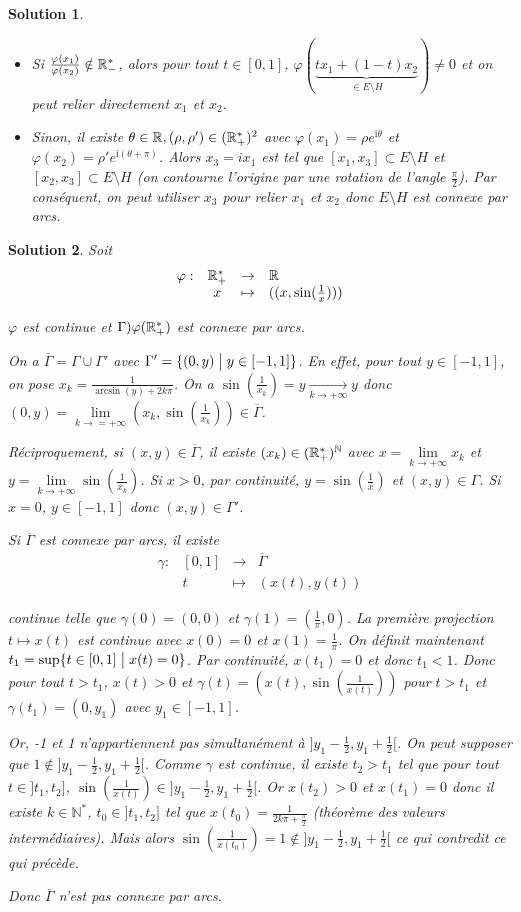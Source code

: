 \documentclass[12pt]{article}
\newtheorem{solution}{Solution}[section]
\theoremstyle{remark}
\newcommand{\N}{\mathbb{N}} \newcommand{\Z}{\mathbb{Z}}
\newcommand{\function}[5]{
	$$
	\begin{array}{rccl}
		#1: & #2 & \to & #3 \\
		& #4 & \mapsto & #5
	\end{array}
	$$
}
\numberwithin{equation}{section}
\begin{document}
\begin{solution}
\begin{enumerate}
		\begin{itemize}
			\item Si $\frac{\varphi(x_{1})}{\varphi(x_{2})}\notin\mathbb{R}_{-}^{*}$, alors pour tout $t\in[0,1]$, $\varphi(\underbrace{tx_{1}+(1-t)x_{2}}_{\in E\setminus H})\neq0$ et on peut relier directement $x_{1}$ et $x_{2}$.
			\item Sinon, il existe $\theta\in\mathbb{R},(\rho,\rho')\in(\mathbb{R}_{+}^{*})^{2}$ avec $\varphi(x_{1})=\rho e^{\mathrm{i}\theta}$ et $\varphi(x_{2})=\rho'e^{\mathrm{i}(\theta+\pi)}$. Alors $x_{3}=ix_{1}$ est tel que $[x_{1},x_{3}]\subset E\setminus H$ et $[x_{2},x_{3}]\subset E\setminus H$ (on contourne l'origine par une rotation de l'angle $\frac{\pi}{2}$). Par conséquent, on peut utiliser $x_{3}$ pour relier $x_{1}$ et $x_{2}$ donc $E\setminus H$ est connexe par arcs.
		\end{itemize}
	\end{enumerate}
\end{solution}

\begin{solution}
	Soit \function{\varphi}{\R_{+}^{*}}{\R}{x}{((x,\sin(\frac{1}{x})))}
	$\varphi$ est continue et $\Gamma)\varphi(\mathbb{R}_{+}^{*})$ est connexe par arcs.

	On a $\overline{\Gamma}=\Gamma\cup\Gamma'$ avec $\Gamma'=\{(0,y)\bigm| y\in[-1,1]\}$. En effet, pour tout $y\in[-1,1]$, on pose $x_{k}=\frac{1}{\arcsin(y)+2k\pi}$. On a $\sin(\frac{1}{x_{k}})=y\xrightarrow[k\to+\infty]{}y$ donc $(0,y)=\lim\limits_{k\to=+\infty}(x_{k},\sin(\frac{1}{x_{k}}))\in\overline{\Gamma}$.

	Réciproquement, si $(x,y)\in\overline{\Gamma}$, il existe $(x_{k})\in(\R_{+}^{*})^{\N}$ avec $x=\lim\limits_{k\to+\infty}x_{k}$ et $y=\lim\limits_{k\to+\infty}\sin(\frac{1}{x_{k}})$. Si $x>0$, par continuité, $y=\sin(\frac{1}{x})$ et $(x,y)\in\Gamma$. Si $x=0$, $y\in[-1,1]$ donc $(x,y)\in\Gamma'$.

	Si $\overline{\Gamma}$ est connexe par arcs, il existe \function{\gamma}{[0,1]}{\overline{\Gamma}}{t}{(x(t),y(t))}
	continue telle que $\gamma(0)=(0,0)$ et $\gamma(1)=(\frac{1}{\pi},0)$. La première projection $t\mapsto x(t)$ est continue avec $x(0)=0$ et $x(1)=\frac{1}{\pi}$. On définit maintenant $t_{1}=\sup\{t\in[0,1]\bigm| x(t)=0\}$. Par continuité, $x(t_{1})=0$ et donc $t_{1}<1$. Donc pour tout $t>t_{1}$, $x(t)>0$ et $\gamma(t)=(x(t),\sin(\frac{1}{x(t)}))$ pour $t>t_{1}$ et $\gamma(t_{1})=(0,y_{1})$ avec $y_{1}\in[-1,1]$.

	Or, -1 et 1 n'appartiennent pas simultanément à $]y_{1}-\frac{1}{2},y_{1}+\frac{1}{2}[$. On peut supposer que $1\notin]y_{1}-\frac{1}{2},y_{1}+\frac{1}{2}[$. Comme $\gamma$ est continue, il existe $t_{2}>t_{1}$ tel que pour tout $t\in]t_{1},t_{2}]$, $\sin(\frac{1}{x(t)})\in]y_{1}-\frac{1}{2},y_{1}+\frac{1}{2}[$. Or $x(t_{2})>0$ et $x(t_{1})=0$ donc il existe $k\in\N^{*}$, $t_{0}\in]t_{1},t_{2}]$ tel que $x(t_{0})=\frac{1}{2k\pi+\frac{\pi}{2}}$ (théorème des valeurs intermédiaires). Mais alors $\sin(\frac{1}{x(t_{0})})=1\notin]y_{1}-\frac{1}{2},y_{1}+\frac{1}{2}[$ ce qui contredit ce qui précède.

	Donc $\overline{\Gamma}$ n'est pas connexe par arcs.
\end{solution}
\end{document}
